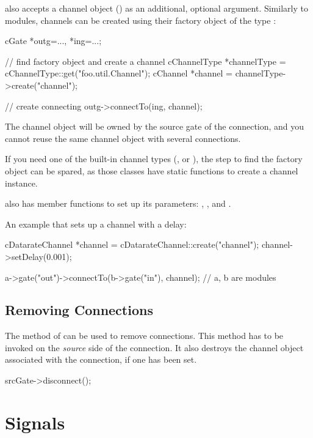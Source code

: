  also accepts a channel object () as an
additional, optional argument. Similarly to modules, channels can be
created using their factory object of the type :

\begin{cpp}
cGate *outg=..., *ing=...;

// find factory object and create a channel
cChannelType *channelType = cChannelType::get("foo.util.Channel");
cChannel *channel = channelType->create("channel");

// create connecting
outg->connectTo(ing, channel);
\end{cpp}

The channel object will be owned by the source gate of the connection, and
you cannot reuse the same channel object with several connections.

If you need one of the built-in channel types (,
 or ), the step to find the
factory object can be spared, as those classes have static 
functions to create a channel instance.

 also has member functions to set up its
parameters: , ,
 and .

An example that sets up a channel with a delay:

\begin{cpp}
cDatarateChannel *channel = cDatarateChannel::create("channel");
channel->setDelay(0.001);

a->gate("out")->connectTo(b->gate("in"), channel); // a, b are modules
\end{cpp}


\subsection{Removing Connections}

The  method of  can be
used to remove connections. This method has to be invoked
on the \textit{source} side of the connection. It also destroys
the channel object associated with the connection, if one has been set.

\begin{cpp}
srcGate->disconnect();
\end{cpp}

\section{Signals}
\label{sec:simple-modules:signals}

